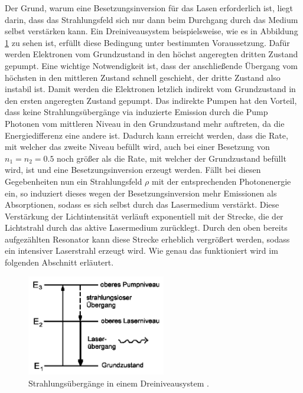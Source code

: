 Der Grund, warum eine Besetzungsinversion für das Lasen erforderlich ist, liegt darin, dass das
Strahlungsfeld sich nur dann beim Durchgang durch das Medium selbst verstärken kann.
Ein Dreiniveausystem beispielsweise, wie es in Abbildung \ref{fig:dreiniveau} zu sehen ist,
erfüllt diese Bedingung unter bestimmten Voraussetzung.
Dafür werden Elektronen vom Grundzustand in den höchst angeregten dritten Zustand gepumpt.
Eine wichtige Notwendigkeit ist, dass der anschließende Übergang vom höchsten in
den mittleren Zustand schnell geschieht, der dritte Zustand also instabil ist. Damit werden
die Elektronen letzlich indirekt vom Grundzustand in den ersten angeregten Zustand gepumpt.
Das indirekte Pumpen hat den Vorteil, dass keine Strahlungsübergänge via induzierte Emission
durch die Pump Photonen vom mittleren Niveau in den Grundzustand mehr auftreten, da die
Energiedifferenz eine andere ist. Dadurch kann erreicht werden, dass die Rate, mit welcher
das zweite Niveau befüllt wird, auch bei einer Besetzung von $n_1 = n_2 = 0.5$ noch größer
als die Rate, mit welcher der Grundzustand befüllt wird, ist und eine Besetzungsinversion
erzeugt werden. Fällt bei diesen Gegebenheiten nun ein Strahlungsfeld $\rho$ mit
der entsprechenden Photonenergie ein, so induziert dieses wegen der Besetzungsinversion mehr
Emissionen als Absorptionen, sodass es sich selbst durch das Lasermedium verstärkt.
Diese Verstärkung der Lichtintensität verläuft exponentiell mit der Strecke, die der Lichtstrahl
durch das aktive Lasermedium zurücklegt. Durch den oben bereits aufgezählten Resonator kann diese
Strecke erheblich vergrößert werden, sodass ein intensiver Laserstrahl erzeugt wird.
Wie genau das funktioniert wird im folgenden Abschnitt erläutert.

\begin{figure}[H]
  \centering
  \includegraphics[height = 4.4cm]{Pics von Buddy/dreiniveau.png}
  \caption{Strahlungsübergänge in einem Dreiniveausystem \cite{laser}.}
  \label{fig:dreiniveau}
\end{figure}

